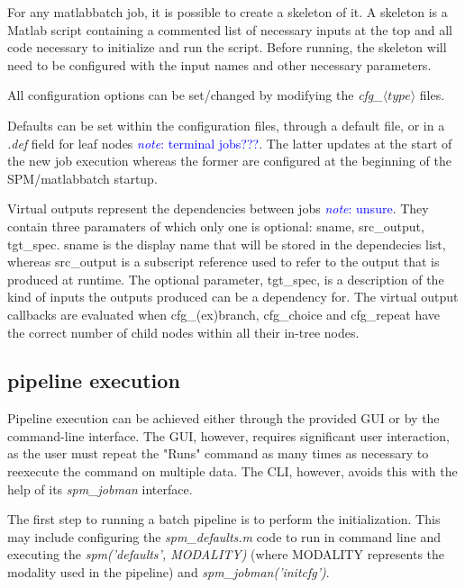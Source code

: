 \documentclass{report}
\newcommand{\note}[1]{\textcolor{blue}{\textit{note}: #1}}
\begin{document}
        For any matlabbatch job, it is possible to create a skeleton of it. A
        skeleton is a Matlab script containing a commented list of necessary
        inputs at the top and all code necessary to initialize and run the
        script. Before running, the skeleton will need to be configured with the
        input names and other necessary parameters.

        All configuration options can be set/changed by modifying the
        \textit{cfg\_$\langle type \rangle$ } files. 

        Defaults can be set within the configuration files, through a default
        file, or in a \textit{.def} field for leaf nodes \note{terminal
        jobs???}. The latter updates at the start of the new job execution
        whereas the former are configured at the beginning of the
        SPM/matlabbatch startup.


        Virtual outputs represent the dependencies between jobs \note{unsure}.
        They contain three paramaters of which only one is optional: sname,
        src\_output, tgt\_spec. sname is the display name that will be stored in
        the dependecies list, whereas src\_output is a subscript reference used
        to refer to the output that is produced at runtime. The optional
        parameter, tgt\_spec, is a description of the kind of inputs the outputs
        produced can be a dependency for. The virtual output callbacks are
        evaluated when cfg\_(ex)branch, cfg\_choice and cfg\_repeat have the
        correct number of child nodes within all their in-tree nodes. 

        \subsection{pipeline execution} Pipeline execution can be achieved
        either through the provided GUI or by the command-line interface. The
        GUI, however, requires significant user interaction, as the user must
        repeat the "Runs" command as many times as necessary to reexecute the
        command on multiple data. The CLI, however, avoids this with the help of
        its \textit{spm\_jobman} interface.

        The first step to running a batch pipeline is to perform the
        initialization. This may include configuring the
        \textit{spm\_defaults.m} code to run in command line and executing the
        \textit{spm(’defaults’, MODALITY)} (where MODALITY represents the
        modality used in the pipeline) and \textit{spm\_jobman(’initcfg’)}.
\end{document}
